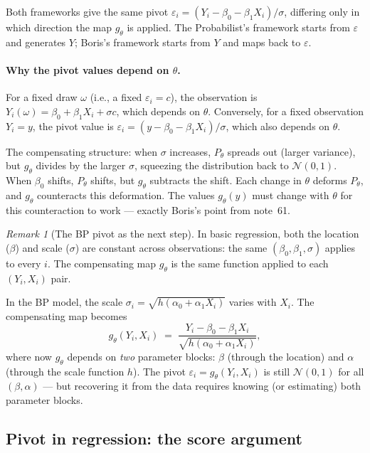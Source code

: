 \documentclass[a4paper,oneside,12pt]{extarticle}
\theoremstyle{plain}
\theoremstyle{definition}
\theoremstyle{remark}
\newtheorem{remark}[proposition]{Remark}
\begin{document}
Both frameworks give the same pivot $\varepsilon_i = (Y_i -
\beta_0 - \beta_1 X_i)/\sigma$, differing only in which direction
the map $g_\theta$ is applied.  The Probabilist's framework starts from
$\varepsilon$ and generates $Y$; Boris's framework starts from $Y$
and maps back to $\varepsilon$.

\paragraph{Why the pivot values depend on $\theta$.}
For a fixed draw $\omega$ (i.e., a fixed $\varepsilon_i = c$),
the observation is $Y_i(\omega) = \beta_0 + \beta_1 X_i + \sigma c$,
which depends on $\theta$.  Conversely, for a fixed observation
$Y_i = y$, the pivot value is $\varepsilon_i = (y - \beta_0 -
\beta_1 X_i)/\sigma$, which also depends on $\theta$.

The compensating structure: when $\sigma$ increases, $P_\theta$
spreads out (larger variance), but $g_\theta$ divides by the larger
$\sigma$, squeezing the distribution back to $\mathcal{N}(0,1)$.
When $\beta_0$ shifts, $P_\theta$ shifts, but $g_\theta$ subtracts
the shift.  Each change in $\theta$ deforms $P_\theta$, and $g_\theta$
counteracts this deformation.  The values $g_\theta(y)$ must change
with $\theta$ for this counteraction to work — exactly Boris's point
from note~61.

\begin{remark}[The BP pivot as the next step]
In basic regression, both the location ($\beta$) and scale ($\sigma$)
are constant across observations: the same $(\beta_0,\beta_1,\sigma)$
applies to every $i$.  The compensating map $g_\theta$ is the same
function applied to each $(Y_i, X_i)$ pair.

In the BP model, the scale $\sigma_i = \sqrt{h(\alpha_0 + \alpha_1
X_i)}$ varies with $X_i$.  The compensating map becomes
\[
  g_\theta(Y_i, X_i)
  \;=\;
  \frac{Y_i - \beta_0 - \beta_1 X_i}{\sqrt{h(\alpha_0 + \alpha_1 X_i)}},
\]
where now $g_\theta$ depends on \emph{two} parameter blocks: $\beta$
(through the location) and $\alpha$ (through the scale function $h$).
The pivot $\varepsilon_i = g_\theta(Y_i, X_i)$ is still
$\mathcal{N}(0,1)$ for all $(\beta,\alpha)$ — but recovering it from
the data requires knowing (or estimating) both parameter blocks.
\end{remark}


\subsection{Pivot in regression: the score argument}
\label{subsec:pivot-score}
\end{document}
